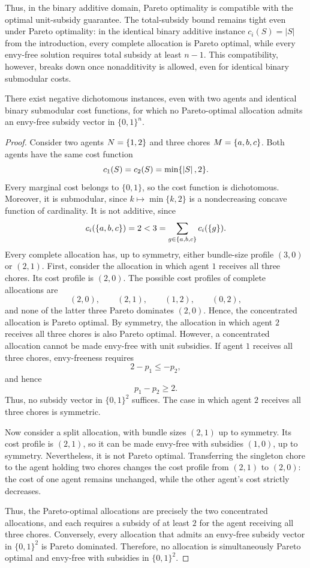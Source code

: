 Thus, in the binary additive domain, Pareto optimality is compatible with the optimal unit-subsidy guarantee. The total-subsidy bound remains tight even under Pareto optimality: in the identical binary additive instance $c_i(S)=|S|$ from the introduction, every complete allocation is Pareto optimal, while every envy-free solution requires total subsidy at least $n-1$. This compatibility, however, breaks down once nonadditivity is allowed, even for identical binary submodular costs.

\begin{proposition}
\label{prop:po-impossibility}
There exist negative dichotomous instances, even with two agents and identical binary submodular cost functions, for which no Pareto-optimal allocation admits an envy-free subsidy vector in $\{0,1\}^n$.
\end{proposition}

\begin{proof}
Consider two agents $N=\left\{1,2\right\}$ and three chores $M=\left\{a,b,c\right\}$. Both agents have the same cost function
\[
    c_1(S)=c_2(S)=\min\{\left\lvert S\right\rvert,2\}.
\]
Every marginal cost belongs to $\{0,1\}$, so the cost function is dichotomous. Moreover, it is submodular, since $k\mapsto\min\{k,2\}$ is a nondecreasing concave function of cardinality. It is not additive, since
\[
    c_i(\left\{a,b,c\right\})=2<3
    =\sum_{g\in\left\{a,b,c\right\}}c_i(\left\{g\right\}).
\]
Every complete allocation has, up to symmetry, either bundle-size
profile $(3,0)$ or $(2,1)$. First, consider the allocation in which agent $1$ receives all three chores. Its cost profile is $(2,0)$. The possible cost profiles of complete allocations are
\[
    (2,0),\qquad (2,1),\qquad (1,2),\qquad (0,2),
\]
and none of the latter three Pareto dominates $(2,0)$. Hence, the concentrated allocation is Pareto optimal. By symmetry, the allocation in which agent $2$ receives all three chores is also Pareto optimal. However, a concentrated allocation cannot be made envy-free with unit subsidies. If agent $1$ receives all three chores, envy-freeness requires
\[
    2-p_1\leq -p_2,
\]
and hence
\[
    p_1-p_2\geq 2.
\]
Thus, no subsidy vector in $\{0,1\}^2$ suffices. The case in which agent $2$ receives all three chores is symmetric.

Now consider a split allocation, with bundle sizes $(2,1)$ up to symmetry. Its cost profile is $(2,1)$, so it can be made envy-free with subsidies $(1,0)$, up to symmetry. Nevertheless, it is not Pareto optimal. Transferring the singleton chore to the agent holding two chores changes the cost profile from $(2,1)$ to $(2,0)$: the cost of one agent remains unchanged, while the other agent's cost strictly decreases.

Thus, the Pareto-optimal allocations are precisely the two concentrated allocations, and each requires a subsidy of at least $2$ for the agent receiving all three chores. Conversely, every allocation that admits an envy-free subsidy vector in $\{0,1\}^2$ is Pareto dominated. Therefore, no allocation is simultaneously Pareto optimal and envy-free with subsidies in $\{0,1\}^2$.
\end{proof}

